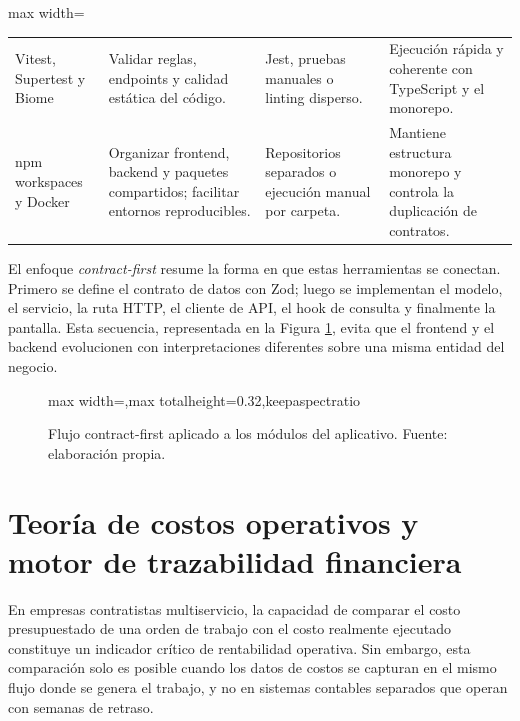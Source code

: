 \begin{table}[!htbp]
\begin{adjustbox}{max width=\textwidth}
\begin{tabular}{|p{3.2cm}|p{4.3cm}|p{3.4cm}|p{4.1cm}|}
Vitest, Supertest y Biome & Validar reglas, endpoints y calidad estática del código. & Jest, pruebas manuales o linting disperso. & Ejecución rápida y coherente con TypeScript y el monorepo.\\
npm workspaces y Docker & Organizar frontend, backend y paquetes compartidos; facilitar entornos reproducibles. & Repositorios separados o ejecución manual por carpeta. & Mantiene estructura monorepo y controla la duplicación de contratos.\\
\hline
\end{tabular}
\end{adjustbox}
\end{table}

El enfoque \textit{contract-first} resume la forma en que estas herramientas se conectan. Primero se define el contrato de datos con Zod; luego se implementan el modelo, el servicio, la ruta HTTP, el cliente de API, el hook de consulta y finalmente la pantalla. Esta secuencia, representada en la Figura \ref{fig:flujo-contract-first-cermont}, evita que el frontend y el backend evolucionen con interpretaciones diferentes sobre una misma entidad del negocio.

\begin{figure}[!htbp]
\centering
\begin{adjustbox}{max width=\textwidth,max totalheight=0.32\textheight,keepaspectratio}

\end{adjustbox}
\caption{Flujo contract-first aplicado a los módulos del aplicativo. Fuente: elaboración propia.}
\label{fig:flujo-contract-first-cermont}
\end{figure}

\section{Teoría de costos operativos y motor de trazabilidad financiera}
\label{sec:teoria-costos}

En empresas contratistas multiservicio, la capacidad de comparar el costo presupuestado de una orden de trabajo con el costo realmente ejecutado constituye un indicador crítico de rentabilidad operativa. Sin embargo, esta comparación solo es posible cuando los datos de costos se capturan en el mismo flujo donde se genera el trabajo, y no en sistemas contables separados que operan con semanas de retraso.

